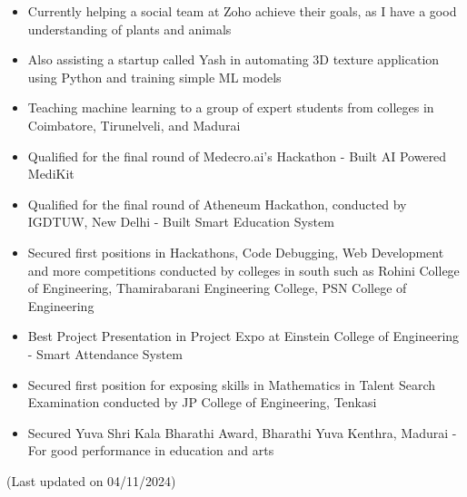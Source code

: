 \documentclass[letterpaper,11pt]{article}
\newcommand{\resheading}[1]{\textbf{\sffamily{\mbox{~}{\large #1} \vphantom{p\^{E}}}}}
\begin{document}
\resheading{Achievements/Activities}
\vspace{-3mm}
	\begin{itemize}
 		\item Currently helping a social team at Zoho achieve their goals, as I have a good understanding of plants and animals
		\vspace{-3mm}
 		\item Also assisting a startup called Yash in automating 3D texture application using Python and training simple ML models
		\vspace{-3mm}
 		\item Teaching machine learning to a group of expert students from colleges in Coimbatore, Tirunelveli, and Madurai
		\vspace{-3mm}
		\item Qualified for the final round of Medecro.ai's Hackathon - Built AI Powered MediKit
		\vspace{-3mm}
		\item Qualified for the final round of Atheneum Hackathon, conducted by IGDTUW, New Delhi - Built Smart Education System
		\vspace{-3mm}
		\item Secured first positions in Hackathons, Code Debugging, Web Development and more competitions conducted by colleges in south such as Rohini College of Engineering, Thamirabarani Engineering College, PSN College of Engineering
		\vspace{-3mm}
		\item Best Project Presentation in Project Expo at Einstein College of Engineering - Smart Attendance System
		\vspace{-3mm}
		\item Secured first position for exposing skills in Mathematics in Talent Search Examination conducted by JP College of Engineering, Tenkasi
		\vspace{-3mm}
		\item Secured Yuva Shri Kala Bharathi Award, Bharathi Yuva Kenthra, Madurai - For good performance in education and arts
    \end{itemize}    
\vspace{2cm}
(Last updated on 04/11/2024)
\end{document}
